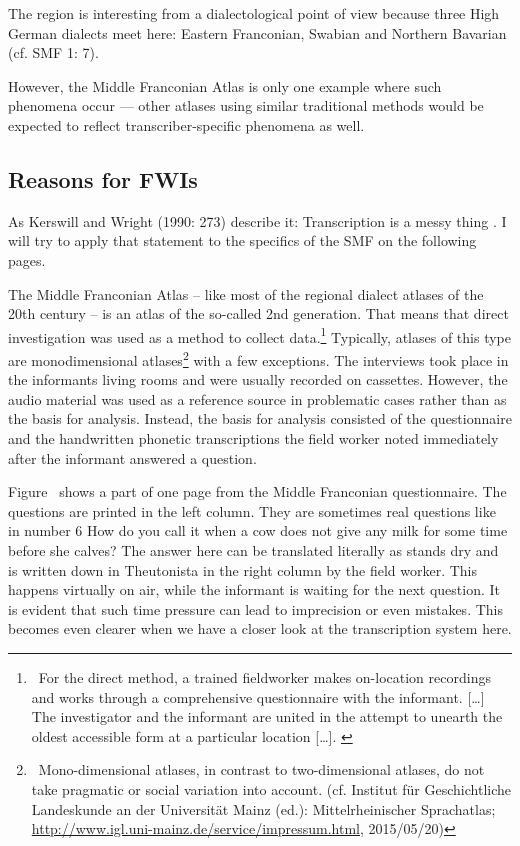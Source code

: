 \documentclass[output=paper]{LSP/langsci}
\begin{document}
The region is interesting from a dialectological point of view because three High German dialects meet here: Eastern Franconian, Swabian and Northern Bavarian (cf. SMF 1: 7).

However, the Middle Franconian Atlas is only one example where such phenomena occur — other atlases using similar traditional methods would be expected to reflect transcriber-specific phenomena as well.

\subsection{Reasons for FWIs}
As Kerswill and Wright (1990: 273) describe it: {\textquotedbl}Transcription is a messy thing{\textquotedbl} \citep[273]{kerswill_limits_1990}. I will try to apply that statement to the specifics of the SMF on the following pages.

The Middle Franconian Atlas – like most of the regional dialect atlases of the 20th century – is an atlas of the so-called 2nd generation. That means that direct investigation was used as a method to collect data.\footnote{\ For the direct method, a {\textquotedbl}trained fieldworker makes on-location recordings and works through a comprehensive questionnaire with the informant. […] The investigator and the informant are united in the attempt to unearth the oldest accessible form at a particular location […].{\textquotedbl} \citep[502]{konig_investigating_2010}} Typically, atlases of this type are monodimensional atlases\footnote{\ Mono-dimensional atlases, in contrast to two-dimensional atlases, do not take pragmatic or social variation into account. (cf. \citealt{bellmann_mittelrheinischer_????} Institut für Geschichtliche Landeskunde an der Universität Mainz (ed.): Mittelrheinischer Sprachatlas; \url{http://www.igl.uni-mainz.de/service/impressum.html}, 2015/05/20)} with a few exceptions. The interviews took place in the informants{\textquotesingle} living rooms and were usually recorded on cassettes. However, the audio material was used as a reference source in problematic cases rather than as the basis for analysis. Instead, the basis for analysis consisted of the questionnaire and the handwritten phonetic transcriptions the field worker noted immediately after the informant answered a question.

Figure~ shows a part of one page from the Middle Franconian questionnaire. The {\textquotedbl}questions{\textquotedbl} are printed in the left column. They are sometimes real questions like in number 6 {\textquotedbl}How do you call it when a cow does not give any milk for some time before she calves?{\textquotedbl} The answer here can be translated literally as {\textquotedbl}stands dry{\textquotedbl} and is written down in Theutonista in the right column by the field worker. This happens virtually {\textquotedbl}on air{\textquotedbl}, while the informant is waiting for the next question. It is evident that such time pressure can lead to imprecision or even mistakes. This becomes even clearer when we have a closer look at the transcription system here.
\end{document}
